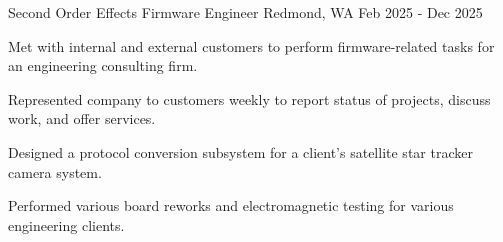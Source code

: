   \begin{cventry}
    {Second Order Effects} %
    {Firmware Engineer} %
    {Redmond, WA} %
    {Feb 2025 - Dec 2025} %
    {
    \begin{cvitems}
      \item{
      Met with internal and external customers to perform firmware-related tasks for
      an engineering consulting firm.
      }
      \item{
      Represented company to customers weekly to report status of projects, discuss work, and offer services.
      }
      \item{
      Designed a protocol conversion subsystem for a client's satellite star tracker camera system.
      }
      \item{
      Performed various board reworks and electromagnetic testing for various engineering clients.
      }
    \end{cvitems}
    }
  \end{cventry}

